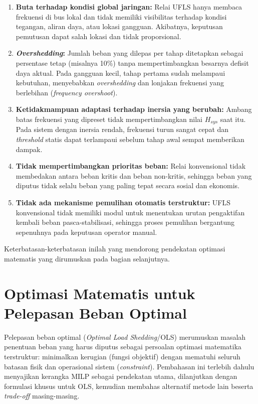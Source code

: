 \begin{enumerate}
\item[a.] \textbf{Buta terhadap kondisi global jaringan:} Relai UFLS hanya membaca frekuensi di bus lokal dan tidak memiliki visibilitas terhadap kondisi tegangan, aliran daya, atau lokasi gangguan. Akibatnya, keputusan pemutusan dapat salah lokasi dan tidak proporsional.
\item[b.] \textbf{\textit{Overshedding}:} Jumlah beban yang dilepas per tahap ditetapkan sebagai persentase tetap (misalnya 10\%) tanpa mempertimbangkan besarnya defisit daya aktual. Pada gangguan kecil, tahap pertama sudah melampaui kebutuhan, menyebabkan \textit{overshedding} dan lonjakan frekuensi yang berlebihan (\textit{frequency overshoot}).
\item[c.] \textbf{Ketidakmampuan adaptasi terhadap inersia yang berubah:} Ambang batas frekuensi yang dipreset tidak mempertimbangkan nilai $H_{sys}$ saat itu. Pada sistem dengan inersia rendah, frekuensi turun sangat cepat dan \textit{threshold} statis dapat terlampaui sebelum tahap awal sempat memberikan dampak.
\item[d.] \textbf{Tidak mempertimbangkan prioritas beban:} Relai konvensional tidak membedakan antara beban kritis dan beban non-kritis, sehingga beban yang diputus tidak selalu beban yang paling tepat secara sosial dan ekonomis.
\item[e.] \textbf{Tidak ada mekanisme pemulihan otomatis terstruktur:} UFLS konvensional tidak memiliki modul untuk menentukan urutan pengaktifan kembali beban pasca-stabilisasi, sehingga proses pemulihan bergantung sepenuhnya pada keputusan operator manual.
\end{enumerate}

Keterbatasan-keterbatasan inilah yang mendorong pendekatan optimasi matematis yang dirumuskan pada bagian selanjutnya.

\section{Optimasi Matematis untuk Pelepasan Beban Optimal}
\label{sec:Optimasi_Matematis}

Pelepasan beban optimal (\textit{Optimal Load Shedding}/OLS) merumuskan masalah penentuan beban yang harus diputus sebagai persoalan optimasi matematika terstruktur: minimalkan kerugian (fungsi objektif) dengan mematuhi seluruh batasan fisik dan operasional sistem (\textit{constraint}). Pembahasan ini terlebih dahulu menyajikan kerangka MILP sebagai pendekatan utama, dilanjutkan dengan formulasi khusus untuk OLS, kemudian membahas alternatif metode lain beserta \textit{trade-off} masing-masing.

